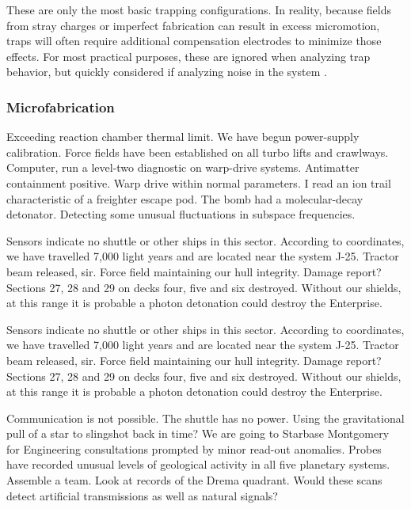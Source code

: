 These are only the most basic trapping configurations. In reality, because fields from stray charges or imperfect fabrication can result in excess micromotion, traps will often require additional compensation electrodes to minimize those effects. For most practical purposes, these are ignored when analyzing trap behavior, but quickly considered if analyzing noise in the system \cite{Brownnutt}.

\subsubsection{Microfabrication}
Exceeding reaction chamber thermal limit. We have begun power-supply calibration. Force fields have been established on all turbo lifts and crawlways. Computer, run a level-two diagnostic on warp-drive systems. Antimatter containment positive. Warp drive within normal parameters. I read an ion trail characteristic of a freighter escape pod. The bomb had a molecular-decay detonator. Detecting some unusual fluctuations in subspace frequencies.

Sensors indicate no shuttle or other ships in this sector. According to coordinates, we have travelled 7,000 light years and are located near the system J-25. Tractor beam released, sir. Force field maintaining our hull integrity. Damage report? Sections 27, 28 and 29 on decks four, five and six destroyed. Without our shields, at this range it is probable a photon detonation could destroy the Enterprise.

Sensors indicate no shuttle or other ships in this sector. According to coordinates, we have travelled 7,000 light years and are located near the system J-25. Tractor beam released, sir. Force field maintaining our hull integrity. Damage report? Sections 27, 28 and 29 on decks four, five and six destroyed. Without our shields, at this range it is probable a photon detonation could destroy the Enterprise.

Communication is not possible. The shuttle has no power. Using the gravitational pull of a star to slingshot back in time? We are going to Starbase Montgomery for Engineering consultations prompted by minor read-out anomalies. Probes have recorded unusual levels of geological activity in all five planetary systems. Assemble a team. Look at records of the Drema quadrant. Would these scans detect artificial transmissions as well as natural signals?


